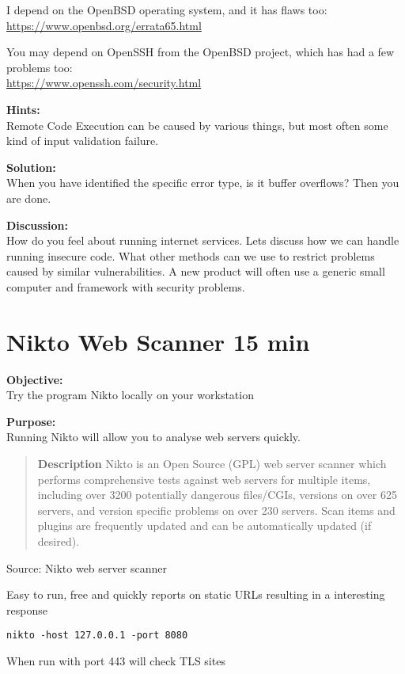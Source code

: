 \documentclass[a4paper,11pt,notitlepage]{report}
\begin{document}
I depend on the OpenBSD operating system, and it has flaws too:\\
\url{https://www.openbsd.org/errata65.html}

You may depend on OpenSSH from the OpenBSD project, which has had a few problems too:\\
\url{https://www.openssh.com/security.html}

{\bf Hints:}\\
Remote Code Execution can be caused by various things, but most often some kind of input validation failure.

{\bf Solution:}\\
When you have identified the specific error type, is it buffer overflows? Then you are done.

{\bf Discussion:}\\
How do you feel about running internet services. Lets discuss how we can handle running insecure code.
What other methods can we use to restrict problems caused by similar vulnerabilities.
A new product will often use a generic small computer and framework with security problems.




\chapter{Nikto Web Scanner 15 min}
\label{ex:nikto-webscanner}

{\bf Objective:}\\
Try the program Nikto locally on your workstation


{\bf Purpose:}\\
Running Nikto will allow you to analyse web servers quickly.


\begin{quote}
{\bf Description}
Nikto is an Open Source (GPL) web server scanner which performs
comprehensive tests against web servers for multiple items, including
over 3200 potentially dangerous files/CGIs, versions on over 625
servers, and version specific problems on over 230 servers. Scan items
and plugins are frequently updated and can be automatically updated
(if desired).
\end{quote}

Source: Nikto web server scanner 


\begin{list1}
\item Easy to run, free and quickly reports on static URLs resulting in a interesting response
\item \verb+nikto -host 127.0.0.1 -port 8080+
\item When run with port 443 will check TLS sites
\end{list1}
\end{document}
